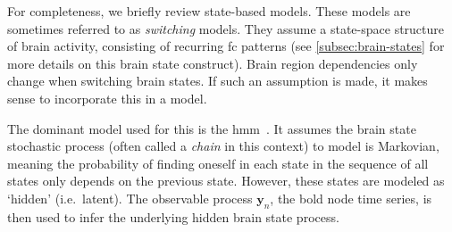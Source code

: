 For completeness, we briefly review state-based models.
These models are sometimes referred to as \emph{switching} models.
They assume a state-space structure of brain activity, consisting of recurring \gls{fc} patterns (see \cref{subsec:brain-states} for more details on this brain state construct).
Brain region dependencies only change when switching brain states.
If such an assumption is made, it makes sense to incorporate this in a model.

The dominant model used for this is the \gls{hmm}~\parencite[see e.g.][]{Vidaurre2017, Ahrends2022}.
It assumes the brain state stochastic process (often called a \emph{chain} in this context) to model is Markovian, meaning the probability of finding oneself in each state in the sequence of all states only depends on the previous state.
However, these states are modeled as `hidden' (i.e.~latent).
The observable process $\mathbf{y}_n$, the \gls{bold} node time series, is then used to infer the underlying hidden brain state process.
